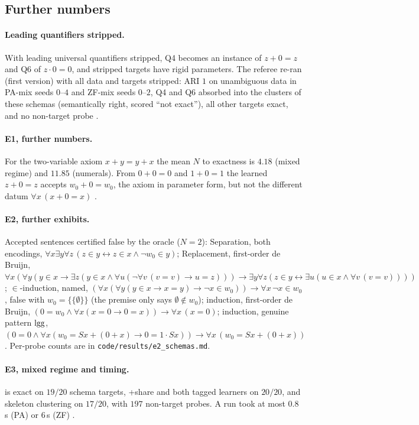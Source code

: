 \subsection{Further numbers}\label{app:exp:numbers}

\paragraph{Leading quantifiers stripped.} With leading universal quantifiers stripped, Q4 becomes an instance of $z+0=z$ and Q6 of $z\cdot0=0$, and stripped targets have rigid parameters. The referee re-ran \DTRC{} (first version) with all data and targets stripped: ARI $1$ on unambiguous data in PA-mix seeds $0$--$4$ and ZF-mix seeds $0$--$2$, Q4 and Q6 absorbed into the clusters of these schemas (semantically right, scored ``not exact''), all other targets exact, and no non-target probe .

\paragraph{E1, further numbers.} For the two-variable axiom $x+y=y+x$ the mean $N$ to exactness is $4.18$ (mixed regime) and $11.85$ (numerals). From $0+0=0$ and $1+0=1$ the learned $z+0=z$ accepts $w_0+0=w_0$, the axiom in parameter form, but not the different datum $\forall x\,(x+0=x)$ .

\paragraph{E2, further exhibits.} Accepted sentences certified false by the oracle ($N=2$): Separation, both encodings, $\forall x\exists y\forall z\,(z\in y\leftrightarrow z\in x\wedge\neg w_0\in y)$; Replacement, first-order de Bruijn, $\forall x(\forall y(y\in x\to\exists z(y\in x\wedge\forall u(\neg\forall v\,(v=v)\to u=z)))\to\exists y\forall z(z\in y\leftrightarrow\exists u(u\in x\wedge\forall v\,(v=v))))$; $\in$-induction, named, $(\forall x(\forall y(y\in x\to x=y)\to\neg x\in w_0))\to\forall x\,\neg x\in w_0$, false with $w_0=\{\{\emptyset\}\}$ (the premise only says $\emptyset\notin w_0$); induction, first-order de Bruijn, $(0=w_0\wedge\forall x(x=0\to 0=x))\to\forall x\,(x=0)$; induction, genuine pattern $\mathrm{lgg}$, $(0=0\wedge\forall x(w_0=Sx+(0+x)\to 0=1\cdot Sx))\to\forall x\,(w_0=Sx+(0+x))$. Per-probe counts are in \texttt{code/results/e2\_schemas.md}.

\paragraph{E3, mixed regime and timing.} \DTRC{} is exact on $19/20$ schema targets, \DTRC{}+share and both tagged learners on $20/20$, and skeleton clustering on $17/20$, with $197$ non-target probes. A \DTRC{} run took at most $0.8$\,s (PA) or $6$\,s (ZF) .

